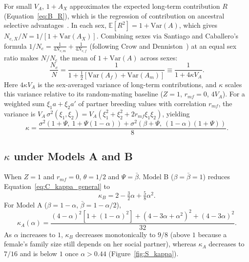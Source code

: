\documentclass{article}
\begin{document}
For small $V_A$, $1 + A_X$ approximates the expected long-term contribution $R$ (Equation~\eqref{eq:B_R}), which is the regression of contribution on ancestral selective advantages~\cite[Equation~6b]{woolliams1999}. In each sex, $\mathbb{E}[R^2] = 1 + \mathrm{Var}(A)$, which gives $N_{e,X}/N = 1/[1 + \mathrm{Var}(A_X)]$. Combining sexes via Santiago and Caballero's~\cite{santiago1995} formula $1/N_e = \frac{1}{4N_{e,m}} + \frac{1}{4N_{e,f}}$ (following Crow and Denniston~\cite{crow1988}) at an equal sex ratio makes $N/N_e$ the mean of $1 + \mathrm{Var}(A)$ across sexes:
\begin{equation}
    \frac{N_e}{N} = \frac{1}{1 + \tfrac{1}{2}\left[\mathrm{Var}(A_f) + \mathrm{Var}(A_m)\right]} \equiv \frac{1}{1 + 4\kappa V_A}. \label{eq:kappa_def}
\end{equation}
Here $4\kappa V_A$ is the sex-averaged variance of long-term contributions, and $\kappa$ scales this variance relative to its random-mating baseline ($Z = 1$, $r_{mf} = 0$, $4V_A$). For a weighted sum $\xi_1 a + \xi_2 a'$ of partner breeding values with correlation $r_{mf}$, the variance is $V_A\,\sigma^2(\xi_1, \xi_2) = V_A(\xi_1^2 + \xi_2^2 + 2r_{mf}\xi_1\xi_2)$, yielding
\begin{equation}
    \kappa = \frac{\sigma^2\!\left(1+\Psi,\ 1+\Psi(1-\alpha)\right) + \sigma^2\!\left(\beta+\Psi,\ (1-\alpha)(1+\Psi)\right)}{8}. \label{eq:C_kappa_general}
\end{equation}

\subsection{\texorpdfstring{$\kappa$}{kappa} under Models A and B}\label{app:C_limits}
When $Z = 1$ and $r_{mf} = 0$, $\theta = 1/2$ and $\Psi = \bar{\beta}$. Model B ($\beta = \bar{\beta} = 1$) reduces Equation~\eqref{eq:C_kappa_general} to
\begin{equation}
    \kappa_B = 2 - \tfrac32\alpha + \tfrac58\alpha^2. \label{eq:kappaB}
\end{equation}
For Model A ($\beta = 1 - \alpha$, $\bar{\beta} = 1 - \alpha/2$),
\begin{equation}
    \kappa_A(\alpha) = \frac{(4-\alpha)^2\left[1+(1-\alpha)^2\right] + (4-3\alpha+\alpha^2)^2 + (4-3\alpha)^2}{32}.
\end{equation}
As $\alpha$ increases to $1$, $\kappa_B$ decreases monotonically to $9/8$ (above $1$ because a female's family size still depends on her social partner), whereas $\kappa_A$ decreases to $7/16$ and is below $1$ once $\alpha > 0.44$ (Figure~\ref{fig:S_kappa}).
\end{document}
